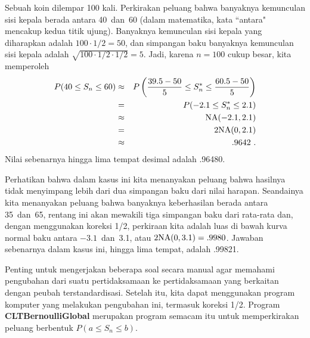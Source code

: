 \begin{example}\label{exam 9.2}
Sebuah koin dilempar 100 kali.  Perkirakan peluang bahwa banyaknya kemunculan sisi kepala
berada antara 40~dan~60 (dalam matematika, kata ``antara" mencakup kedua titik ujung).  Banyaknya
kemunculan sisi kepala yang diharapkan adalah
$100
\cdot 1/2 = 50$, dan simpangan baku banyaknya kemunculan sisi kepala adalah $\sqrt{100 \cdot 1/2
\cdot 1/2} = 5$.  Jadi, karena $n = 100$ cukup besar, kita memperoleh
\begin{eqnarray*}
P(40 \le S_n \le 60) &\approx& 
P\left( \frac {39.5 - 50}5 \le S_n^* \le \frac {60.5 - 50}5 \right) \\
                     &=& P(-2.1 \le S_n^* \le 2.1) \\
                     &\approx& {\rm NA}(-2.1,2.1) \\ 
                     &=& 2{\rm NA}(0,2.1) \\
                     &\approx& .9642\ .  
\end{eqnarray*}
Nilai sebenarnya hingga lima tempat desimal adalah .96480.
\par
Perhatikan bahwa dalam kasus ini kita menanyakan peluang bahwa hasilnya
tidak menyimpang lebih dari dua simpangan baku dari nilai harapan.  Seandainya
kita menanyakan peluang bahwa banyaknya keberhasilan berada antara 35~dan~65,
rentang ini akan mewakili tiga simpangan baku dari rata-rata dan, dengan menggunakan koreksi 1/2,
perkiraan kita adalah luas di bawah kurva normal baku antara $-3.1$~dan~3.1, 
atau $2{\rm NA}(0,3.1) = .9980$.  Jawaban sebenarnya dalam kasus ini, hingga lima tempat, adalah .99821.  
\end{example}


Penting untuk mengerjakan beberapa soal secara manual agar memahami pengubahan
dari suatu pertidaksamaan ke pertidaksamaan yang berkaitan dengan peubah
terstandardisasi.  Setelah itu, kita dapat menggunakan program komputer yang melakukan
pengubahan ini, termasuk koreksi 1/2.  Program {\bf
CLTBernoulliGlobal} merupakan program semacam itu untuk memperkirakan peluang
berbentuk
$P(a \leq S_n \leq b)$.

